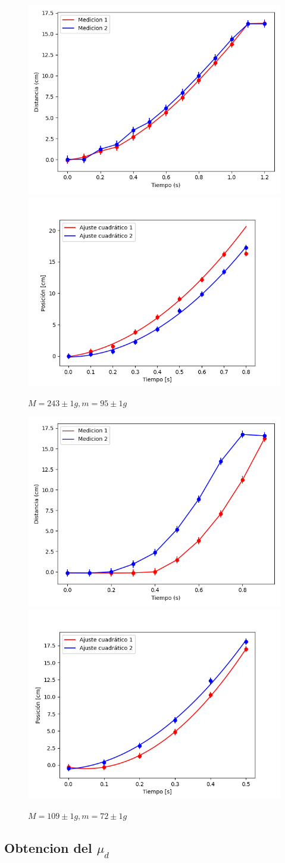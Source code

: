 \documentclass[12pt,a4]{article}
\begin{document}
\begin{figure}[H]
    \centering
    \includegraphics[width=0.4\linewidth]{TiempoVsDistanciaPapelPapelM_OP.png}
    \includegraphics[width=0.44\linewidth]{ajuste2_PapelPapelM_OP.png}
    \caption{$M = 243 \pm 1 g, m = 95 \pm 1 g$}
    \label{fig:M_OP papel papel}
\end{figure}

\begin{figure}[H] %
    \centering
    \includegraphics[width=0.4\linewidth]{TiempoVsDistanciaPapelPapelV_O.png}
    \includegraphics[width=0.44\linewidth]{ajuste2_PapelPapelV_O.png}
    \caption{$M = 109 \pm 1 g, m = 72 \pm 1 g$}
    \label{fig:TvDV_O papel papel}
\end{figure}

\subsection{Obtencion del $\mu_d$}
\end{document}
